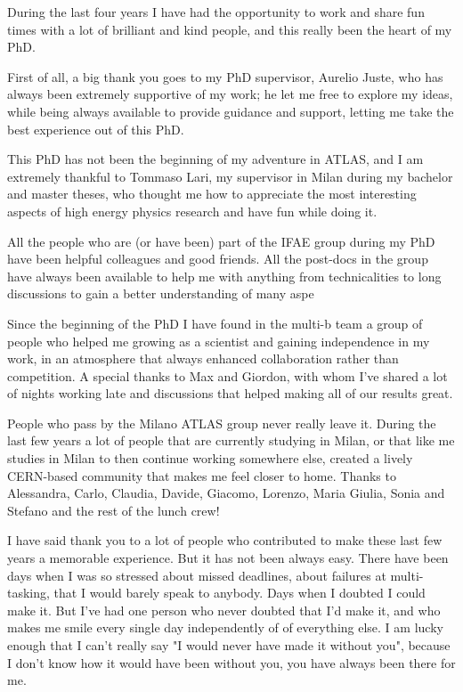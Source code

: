 During the last four years I have had the opportunity to work and share fun times with a lot 
of brilliant and kind people, and this really been the heart of my PhD. 

First of all, a big thank you goes to my PhD supervisor, Aurelio Juste, who has always been 
extremely supportive of my work; 
he let me free to explore my ideas, while being always available to provide guidance and support, 
letting me take the best experience out of this PhD. 

This PhD has not been the beginning of my adventure in ATLAS, and I am extremely thankful to 
Tommaso Lari, my supervisor in Milan during my bachelor and master theses,  
who thought me how to appreciate the most interesting aspects of high energy physics research 
and have fun while doing it.  

All the people who are (or have been) part of the IFAE group during my PhD have been helpful colleagues and 
good friends. All the post-docs in the group have always been available to help me with 
anything from technicalities to long discussions to gain a better understanding of many aspe

Since the beginning of the PhD I have found in the multi-b team a group of people who helped me 
growing as a scientist and gaining independence in my work, 
in an atmosphere that always enhanced collaboration rather than competition. 
A special thanks to Max and Giordon, with whom I've shared a lot of nights working late and 
discussions that helped making all of our results great. 

People who pass by the Milano ATLAS group never really leave it. 
During the last few years a lot of people that are currently studying in Milan, or that like me 
studies in Milan to then continue working somewhere else, created a lively CERN-based community that 
makes me feel closer to home. 
Thanks to Alessandra, Carlo, Claudia, Davide, Giacomo, Lorenzo, Maria Giulia, Sonia and Stefano and the rest of the 
lunch crew! 

I have said thank you to a lot of people who contributed to make these last few years a memorable experience. 
But it has not been always easy. There have been days when I was so stressed about missed deadlines, 
about failures at multi-tasking, that 
I would barely speak to anybody. 
Days when I doubted I could make it. 
But I've had one person who never doubted that I'd make it, and who makes me smile every single day independently 
of of everything else. 
I am lucky enough that I can't really say "I would never have made it without you", 
because I don't know how it would have been without you, you have always been there for me. 
